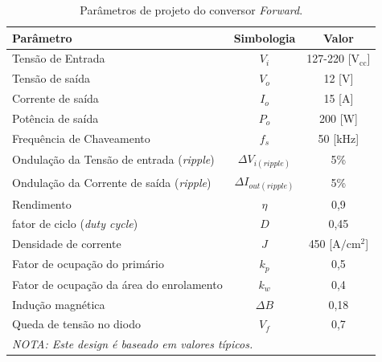 \begin{table}[H]
    \centering
    \footnotesize
    \caption{Parâmetros de projeto do conversor \textit{Forward}.}
    \label{Conversor_cc/cc1}
    \begin{adjustbox}{max width = \textwidth}
        \begin{tabular}{|l|c|c|}
            \hline
            \rowcolor[HTML]{A8DADC}
            \textbf{Parâmetro} & \textbf{Simbologia} & \textbf{Valor}  \\ \hline
            Tensão de Entrada & $V_{i}$ & 127-220 [V$_\text{cc}$]
            \\ \hline
            Tensão de saída & $V_{o}$ & 12 [V] 
            \\ \hline
            Corrente de saída & $I_{o}$ & 15 [A]
            \\ \hline
              Potência de saída & $P_{o}$ & 200 [W] 
             \\ \hline
              Frequência de Chaveamento & $f_{s}$ & 50 [kHz]
             \\ \hline
               Ondulação da Tensão de entrada (\textit{ripple}) & $\Delta V_{i(ripple)}$ & 5\%
             \\ \hline
                Ondulação da Corrente de saída (\textit{ripple}) & $\Delta I_{out(ripple)}$ & 5\%
             \\ \hline
                Rendimento & $\eta$ & 0,9
             \\ \hline
                fator de ciclo (\textit{duty cycle}) & $D$ & 0,45
             \\ \hline
                Densidade de corrente & $J$ & 450 [$\text{A}/\text{cm}^{2}$]
             \\ \hline
                 Fator de ocupação do primário & $k_{p}$ & 0,5
             \\ \hline
                 Fator de ocupação da área do enrolamento & $k_{w}$ & 0,4
             \\ \hline
                 Indução magnética & $\Delta B$ & 0,18
             \\ \hline
                  Queda de tensão no diodo & $V_{f}$ & 0,7
             \\ \hline
             \multicolumn{3}{l}{\textit{NOTA: Este design é baseado em valores típicos.}} \\ 
        \end{tabular}
    \end{adjustbox}
\end{table}

